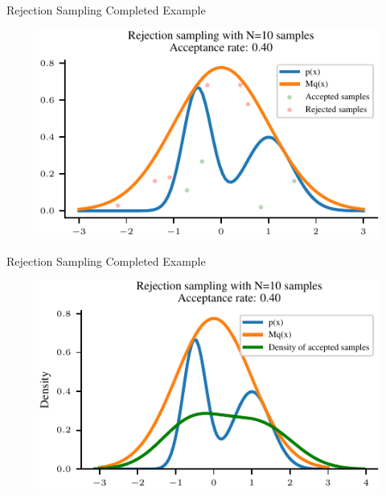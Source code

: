 \documentclass[handout]{beamer}
\begin{document}
    \begin{frame}{Rejection Sampling Completed Example}
        \begin{figure}
            \centering
            \includegraphics{notebooks/figures/sampling/rejection-sampling-N10-False.pdf}
        \end{figure}
        
    \end{frame}

    \begin{frame}{Rejection Sampling Completed Example}
        \begin{figure}
            \centering
            \includegraphics{notebooks/figures/sampling/rejection-sampling-N10-True.pdf}
        \end{figure}
        
    \end{frame}
\end{document}
